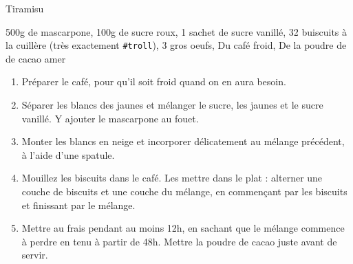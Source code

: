 \begin{recette}{Tiramisu}
	\begin{ingredients}
			 500g de mascarpone\sep
			 100g de sucre roux\sep
			 1 sachet de sucre vanillé\sep
			 32 buiscuits à la cuillère (très exactement \texttt{\#troll})\sep
			 3 gros oeufs\sep
			 Du café froid\sep
			 De la poudre de de cacao amer
	\end{ingredients}
	
	\begin{enumerate}
		\item Préparer le café, pour qu'il soit froid quand on en aura besoin.
		\item Séparer les blancs des jaunes et mélanger le sucre, les jaunes et le sucre vanillé. Y ajouter le mascarpone au fouet.
		\item Monter les blancs en neige et incorporer délicatement au mélange précédent, à l'aide d'une spatule.
		\item Mouillez les biscuits dans le café. Les mettre dans le plat : alterner une couche de biscuits et une couche du mélange, en commençant par les biscuits et finissant par le mélange.
		\item Mettre au frais pendant au moins 12h, en sachant que le mélange commence à perdre en tenu à partir de 48h. Mettre la poudre de cacao juste avant de servir.
	\end{enumerate}
\end{recette}
